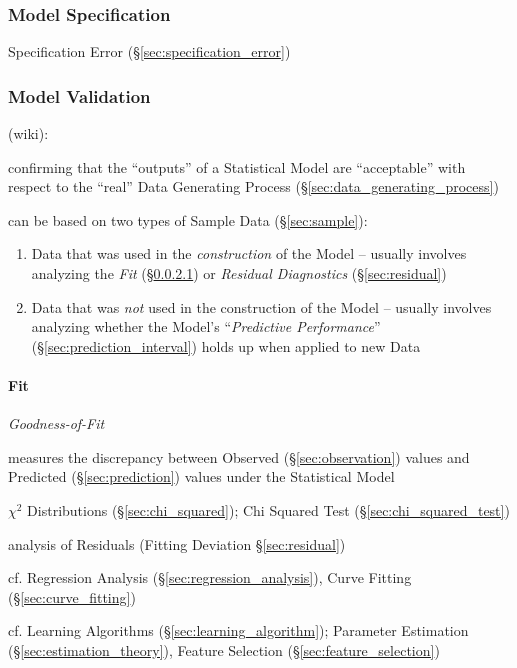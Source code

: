 \subsubsection{Model Specification}\label{sec:model_specification}

\fist Specification Error (\S\ref{sec:specification_error})



\subsubsection{Model Validation}\label{sec:model_validation}

(wiki):

confirming that the ``outputs'' of a Statistical Model are ``acceptable'' with
respect to the ``real'' Data Generating Process
(\S\ref{sec:data_generating_process})

can be based on two types of Sample Data (\S\ref{sec:sample}):
\begin{enumerate}
  \item Data that was used in the \emph{construction} of the Model -- usually
    involves analyzing the \emph{Fit} (\S\ref{sec:model_fit}) or \emph{Residual
      Diagnostics} (\S\ref{sec:residual})
  \item Data that was \emph{not} used in the construction of the Model --
    usually involves analyzing whether the Model's ``\emph{Predictive
      Performance}'' (\S\ref{sec:prediction_interval}) holds up when applied to
    new Data
\end{enumerate}



\paragraph{Fit}\label{sec:model_fit}\hfill

\emph{Goodness-of-Fit}

measures the discrepancy between Observed (\S\ref{sec:observation}) values and
Predicted (\S\ref{sec:prediction}) values under the Statistical Model

$\chi^2$ Distributions (\S\ref{sec:chi_squared});
Chi Squared Test (\S\ref{sec:chi_squared_test})

\fist analysis of Residuals (Fitting Deviation \S\ref{sec:residual})

cf. Regression Analysis (\S\ref{sec:regression_analysis}), Curve Fitting
(\S\ref{sec:curve_fitting})

\fist cf. Learning Algorithms (\S\ref{sec:learning_algorithm});
Parameter Estimation (\S\ref{sec:estimation_theory}), Feature Selection
(\S\ref{sec:feature_selection})

